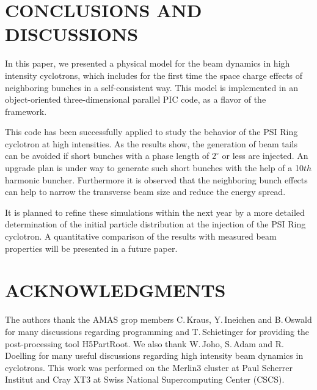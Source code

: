 \documentclass{JAC2003}
\begin{document}
\section{CONCLUSIONS AND DISCUSSIONS}
In this paper, we presented a physical model for the beam dynamics in high intensity cyclotrons, which includes for the first time the space charge effects
of neighboring bunches in a self-consistent way. This model is implemented in an object-oriented three-dimensional parallel PIC code, 
as a flavor of the \opal\, framework. 

This code has been successfully applied to study the behavior of the PSI Ring cyclotron at high intensities.
As the results show, the generation of beam tails can be avoided if short bunches with a phase length of $2^\circ$  or less are injected. 
An upgrade plan is under way to generate such short bunches with the help of a 10$th$ harmonic buncher.
Furthermore it is observed that the neighboring bunch effects can help to narrow the transverse beam size and reduce the energy spread.

It is planned to refine these simulations within the next year by a more detailed determination of the initial particle distribution at the injection
of the PSI Ring cyclotron. A quantitative comparison of the results with measured beam properties will be presented in a future paper.
\section{ACKNOWLEDGMENTS}
The authors thank the AMAS grop members C.\,Kraus, Y.\,Ineichen and B.\,Oswald for many 
discussions regarding programming and T.\,Schietinger for providing the post-processing tool
H5PartRoot. We also thank W.\,Joho, S.\,Adam and R.\,Doelling for many useful discussions regarding high
intensity beam dynamics in cyclotrons. This work was performed on the Merlin3 cluster at Paul Scherrer Institut 
and Cray XT3 at Swiss National Supercomputing Center (CSCS). 
\end{document}

